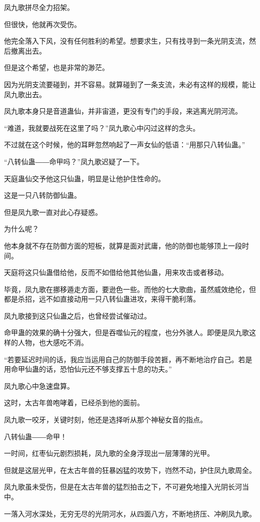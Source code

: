 \begin{this_body}
凤九歌拼尽全力招架。

但很快，他就再次受伤。

他完全落入下风，没有任何胜利的希望。想要求生，只有找寻到一条光阴支流，然后撤离出去。

但是这个希望，也是非常的渺茫。

因为光阴支流要碰到，并不容易。就算碰到了一条支流，未必有这样的规模，能让凤九歌出去。

凤九歌本身只是音道蛊仙，并非宙道，更没有专门的手段，来逃离光阴河流。

“难道，我就要战死在这里了吗？”凤九歌心中闪过这样的念头。

不过就在这个时候，他的耳畔忽然响起了一声女仙的低语：“用那只八转仙蛊。”

“八转仙蛊――命甲吗？”凤九歌迟疑了一下。

天庭蛊仙交予他这只仙蛊，明显是让他护住性命的。

这是一只八转防御仙蛊。

但是凤九歌一直对此心存疑惑。

为什么呢？

他本身就不存在防御方面的短板，就算是面对武庸，他的防御也能够顶上一段时间。

天庭将这只仙蛊借给他，反而不如借给他其他仙蛊，用来攻击或者移动。

毕竟，凤九歌在挪移遁走方面，要逊色一些。而他的七大歌曲，虽然威效绝伦，但都是杀招，远不如直接动用一只八转仙蛊进攻，来得干脆利落。

凤九歌接到这只仙蛊之后，也曾经尝试催动过。

命甲蛊的效果的确十分强大，但是吞噬仙元的程度，也分外骇人。即便是凤九歌这样的人物，也大感吃不消。

“若要延迟时间的话，我应当运用自己的防御手段苦捱，再不断地治疗自己。若是用命甲仙蛊的话，恐怕仙元还不够支撑五十息的功夫。”

凤九歌心中急速盘算。

这时，太古年兽咆哮着，已经杀到他的面前。

凤九歌一咬牙，关键时刻，他还是选择听从那个神秘女音的指点。

八转仙蛊――命甲！

一时间，红枣仙元剧烈损耗，凤九歌的全身浮现出一层薄薄的光甲。

但就是这层光甲，在太古年兽的狂暴凶猛的攻势下，岿然不动，护住凤九歌周全。

凤九歌虽未受伤，但是在太古年兽的猛烈拍击之下，不可避免地撞入光阴长河当中。

一落入河水深处，无穷无尽的光阴河水，从四面八方，不断地挤压、冲刷凤九歌。


\end{this_body}
